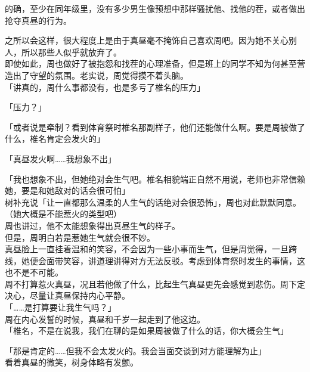 的确，至少在同年级里，没有多少男生像预想中那样骚扰他、找他的茬，或者做出抢夺真昼的行为。

之所以会这样，很大程度上是由于真昼毫不掩饰自己喜欢周吧。因为她不关心别人，所以那些人似乎就放弃了。\\

即使如此，周也做好了被抱怨和找茬的心理准备，但是班上的同学不知为何甚至营造出了守望的氛围。老实说，周觉得摸不着头脑。\\

「讲真的，周什么事都没有，也是多亏了椎名的压力」

「压力？」

「或者说是牵制？看到体育祭时椎名那副样子，他们还能做什么啊。要是周被做了什么，椎名肯定会发火的」

「真昼发火啊……我想象不出」

「我也想象不出，但她绝对会生气吧。椎名相貌端正自然不用说，老师也非常信赖她，要是和她敌对的话会很可怕」\\

树补充说「让一直都那么温柔的人生气的话绝对会很恐怖」，周也对此默默同意。\\

（她大概是不能惹火的类型吧）\\

周也讲过，他不太能想象得出真昼生气的样子。\\

但是，周明白若是惹她生气就会很不妙。\\

真昼脸上一直挂着温和的笑容，不会因为一些小事而生气，但是周觉得，一旦跨线，她便会面带笑容，讲道理讲得对方无法反驳。考虑到体育祭时发生的事情，这也不是不可能。\\

周不打算惹火真昼，况且若他做了什么，比起生气真昼更先会感觉到悲伤。周下定决心，尽量让真昼保持内心平静。\\

「……是打算要让我生气吗？」\\

周在内心发誓的时候，真昼和千岁一起走到了他这边。\\

「椎名，不是在说我，我们在聊的是如果周被做了什么的话，你大概会生气」

「那是肯定的……但我不会太发火的。我会当面交谈到对方能理解为止」\\

看着真昼的微笑，树身体略有发颤。\\

